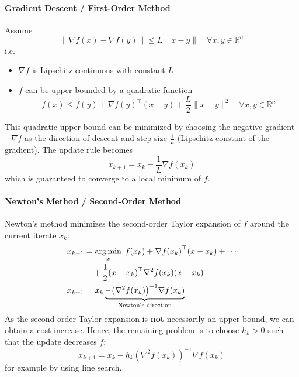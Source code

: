 \paragraph{Gradient Descent / First-Order Method}
Assume
\begin{equation*}
    \|\nabla f(x) - \nabla f(y)\| \leq L \|x - y\| \quad \forall x, y \in \mathbb{R}^n
\end{equation*}
i.e.\
\begin{itemize}
    \item $\nabla f$ is Lipschitz-continuous with constant $L$
    \item $f$ can be upper bounded by a quadratic function
          \begin{equation*}
              f(x) \leq f(y) + \nabla f(y)^\top (x - y) + \frac{L}{2} \|x - y\|^2 \quad \forall x, y \in \mathbb{R}^n
          \end{equation*}
\end{itemize}
\newpar{}
This quadratic upper bound can be minimized by choosing the negative gradient $-\nabla f$ as the direction of descent and step size $\frac{1}{L}$ (Lipschitz constant of the gradient). The update rule becomes
\begin{equation*}
    x_{k+1} = x_k - \frac{1}{L} \nabla f(x_k)
\end{equation*}
which is guaranteed to converge to a local minimum of $f$.
\paragraph{Newton's Method / Second-Order Method}
Newton's method minimizes the second-order Taylor expansion of $f$ around the current iterate $x_k$:
\begin{align*}
    x_{k+1} & = \operatorname*{arg\,min}_{x} \; f(x_k) + \nabla {f(x_k)}^\top (x-x_k) + \cdots                                      \\
            & \quad + \frac{1}{2}{(x-x_k)}^\top \nabla^2 f(x_k)(x-x_k)                                             \\
    x_{k+1} & = x_k \underbrace{- {\left( \nabla^2 f(x_k) \right)}^{-1} \nabla f(x_k)}_{\text{Newton's direction}}
\end{align*}
As the second-order Taylor expansion is \textbf{not} necessarily an upper bound, we can obtain a cost increase. Hence, the remaining problem is to choose $h_k > 0$ such that the update decreases $f$:
\begin{equation*}
    x_{k+1} = x_k - h_k {\left( \nabla^2 f(x_k) \right)}^{-1} \nabla f(x_k)
\end{equation*}
for example by using line search.

